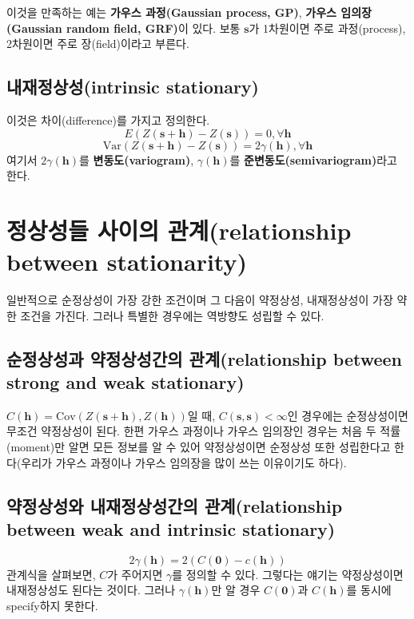 \documentclass[b5paper,]{scrbook}
\theoremstyle{plain}
\theoremstyle{definition}
\numberwithin{equation}{section}
\begin{document}
이것을 만족하는 예는 \textbf{가우스 과정(Gaussian process, GP)},
\textbf{가우스 임의장(Gaussian random field, GRF)}이 있다. 보통
\(\mathbf{s}\)가 1차원이면 주로 과정(process), 2차원이면 주로
장(field)이라고 부른다.

\subsection{내재정상성(intrinsic
stationary)}\label{intrinsic-stationary}

이것은 차이(difference)를 가지고 정의한다.
\[E(Z(\mathbf{s}+\mathbf{h})-Z(\mathbf{s}))=0, \forall \mathbf{h}\]
\[\text{Var}(Z(\mathbf{s}+\mathbf{h})-Z(\mathbf{s}))=2\gamma(\mathbf{h}), \forall \mathbf{h}\]
여기서 \(2\gamma(\mathbf{h})\)를 \textbf{변동도(variogram)},
\(\gamma(\mathbf{h})\)를 \textbf{준변동도(semivariogram)}라고 한다.

\section{정상성들 사이의 관계(relationship between
stationarity)}\label{--relationship-between-stationarity}

일반적으로 순정상성이 가장 강한 조건이며 그 다음이 약정상성,
내재정상성이 가장 약한 조건을 가진다. 그러나 특별한 경우에는 역방향도
성립할 수 있다.

\subsection{순정상성과 약정상성간의 관계(relationship between strong and
weak
stationary)}\label{--relationship-between-strong-and-weak-stationary}

\(C(\mathbf{h})=\text{Cov}(Z(\mathbf{s}+\mathbf{h}), Z(\mathbf{h}))\)일
때, \(C(\mathbf{s},\mathbf{s}) < \infty\)인 경우에는 순정상성이면 무조건
약정상성이 된다. 한편 가우스 과정이나 가우스 임의장인 경우는 처음 두
적률(moment)만 알면 모든 정보를 알 수 있어 약정상성이면 순정상성 또한
성립한다고 한다(우리가 가우스 과정이나 가우스 임의장을 많이 쓰는
이유이기도 하다).

\subsection{약정상성와 내재정상성간의 관계(relationship between weak and
intrinsic
stationary)}\label{--relationship-between-weak-and-intrinsic-stationary}

\[2\gamma(\mathbf{h})=2(C(\mathbf{0})-c(\mathbf{h}))\] 관계식을
살펴보면, \(C\)가 주어지면 \(\gamma\)를 정의할 수 있다. 그렇다는 얘기는
약정상성이면 내재정상성도 된다는 것이다. 그러나 \(\gamma(\mathbf{h})\)만
알 경우 \(C(\mathbf{0})\)과 \(C(\mathbf{h})\)를 동시에 specify하지
못한다.
\end{document}
